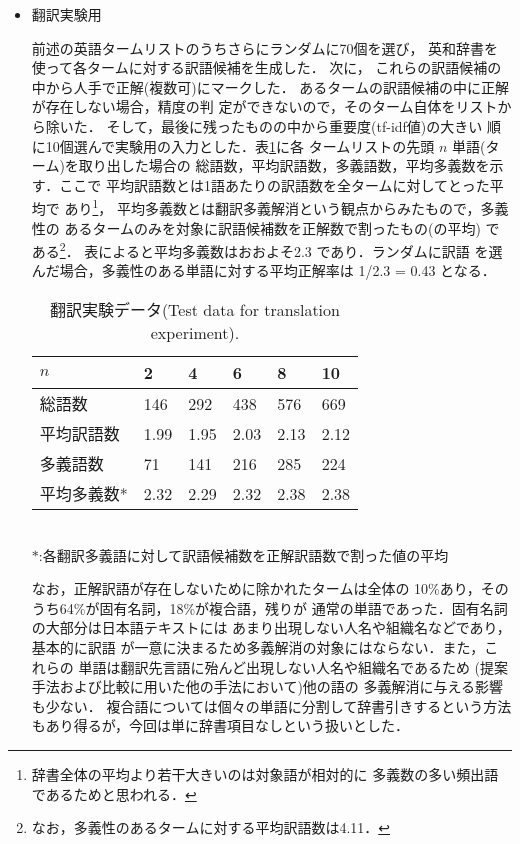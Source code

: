 \begin{itemize}

\item 翻訳実験用

  前述の英語タームリストのうちさらにランダムに70個を選び，
英和辞書を使って各タームに対する訳語候補を生成した． 次に，
これらの訳語候補の中から人手で正解(複数可)にマークした．
あるタームの訳語候補の中に正解が存在しない場合，精度の判
定ができないので，そのターム自体をリストから除いた．
そして，最後に残ったものの中から重要度(tf-idf値)の大きい
順に10個選んで実験用の入力とした．表\ref{Tab.Tdata}に各
タームリストの先頭 $n$ 単語(ターム)を取り出した場合の
総語数，平均訳語数，多義語数，平均多義数を示す．ここで
平均訳語数とは1語あたりの訳語数を全タームに対してとった平均で
あり\footnote{辞書全体の平均より若干大きいのは対象語が相対的に
多義数の多い頻出語であるためと思われる．}，
平均多義数とは翻訳多義解消という観点からみたもので，多義性の
あるタームのみを対象に訳語候補数を正解数で割ったもの(の平均)
である\footnote{なお，多義性のあるタームに対する平均訳語数は4.11．}．
表によると平均多義数はおおよそ2.3 であり．ランダムに訳語
を選んだ場合，多義性のある単語に対する平均正解率は 1/2.3 
= 0.43 となる．

\begin{table}
\caption{翻訳実験データ(Test data for translation experiment).}
\label{Tab.Tdata}
\begin{center}
\begin{tabular}{llllll}\hline
$n$         &  2  &  4  &   6 &   8 & 10  \\\hline
総語数      & 146 & 292 & 438 & 576 & 669  \\
平均訳語数  & 1.99 & 1.95  &  2.03 &  2.13 & 2.12 \\
多義語数    & 71  & 141 & 216 & 285 & 224  \\
平均多義数* & 2.32 & 2.29 & 2.32 & 2.38 & 2.38 \\\hline
\end{tabular} \\ 
$*$:各翻訳多義語に対して訳語候補数を正解訳語数で割った値の平均
\end{center} 	
\end{table}
 
なお，正解訳語が存在しないために除かれたタームは全体の
10\%あり，そのうち64\%が固有名詞，18\%が複合語，残りが
通常の単語であった．固有名詞の大部分は日本語テキストには
あまり出現しない人名や組織名などであり，基本的に訳語
が一意に決まるため多義解消の対象にはならない．また，これらの
単語は翻訳先言語に殆んど出現しない人名や組織名であるため
(提案手法および比較に用いた他の手法において)他の語の
多義解消に与える影響も少ない．
複合語については個々の単語に分割して辞書引きするという方法
もあり得るが，今回は単に辞書項目なしという扱いとした．


\end{itemize}
